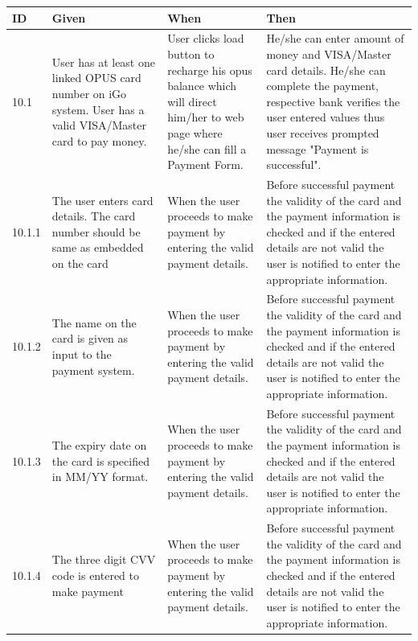 \documentclass[11pt, english]{report}
\begin{document}
\begin{longtable}{ |p{0.5cm}|p{3cm}|p{3.5cm}|p{5cm}| }
\hline
\textbf{ID} & \textbf{Given} & \textbf{When} & \textbf{Then}\\
\hline

10.1&
User has at least one linked OPUS card number on iGo system.
User has a valid VISA/Master card to pay money.
&
User clicks load button to recharge his opus balance which will direct him/her to web page where
he/she can fill a Payment Form.
&
He/she can enter amount of money and VISA/Master card details. He/she can complete the payment, respective bank verifies the user entered values thus user receives prompted message "Payment is successful".
 \\
\hline
10.1.1&
The user enters card details. The card number should be same as embedded on the card&
When the user proceeds to make payment by entering the valid payment details.&
Before successful payment the validity of the card and the payment information is checked and if the entered details are not valid the user is notified to enter the appropriate information. 

 \\
\hline

10.1.2&
The name on the card is given as input to the payment system. &
When the user proceeds to make payment by entering the valid payment details.&
Before successful payment the validity of the card and the payment information is checked and if the entered details are not valid the user is notified to enter the appropriate information. 
 \\
\hline

10.1.3&
The expiry date on the card is specified in MM/YY format.&
When the user proceeds to make payment by entering the valid payment details.&
Before successful payment the validity of the card and the payment information is checked and if the entered details are not valid the user is notified to enter the appropriate information. 

 \\
\hline

10.1.4&
The three digit CVV code is entered to make payment&
When the user proceeds to make payment by entering the valid payment details.&
Before successful payment the validity of the card and the payment information is checked and if the entered details are not valid the user is notified to enter the appropriate information. 

 \\
\hline
\end{longtable}
\end{document}
